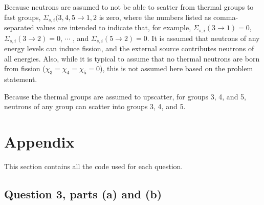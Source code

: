\documentclass[10pt]{article}
\begin{document}
Because neutrons are assumed to not be able to scatter from thermal groups to fast groups, \(\Sigma_{s,i}(3,4,5\rightarrow 1,2\) is zero, where the numbers listed as comma-separated values are intended to indicate that, for example, \(\Sigma_{s,i}(3\rightarrow 1)=0\), \(\Sigma_{s,i}(3\rightarrow 2)=0\), \(\cdots\) , and \(\Sigma_{s,i}(5\rightarrow2)=0\). It is assumed that neutrons of any energy levels can induce fission, and the external source contributes neutrons of all energies. Also, while it is typical to assume that no thermal neutrons are born from fission (\(\chi_3=\chi_4=\chi_5=0\)), this is not assumed here based on the problem statement.

Because the thermal groups are assumed to upscatter, for groups 3, 4, and 5, neutrons of any group can scatter into groups 3, 4, and 5.

\section{Appendix}
This section contains all the code used for each question. 

\subsection{Question 3, parts (a) and (b)}

\end{document}
